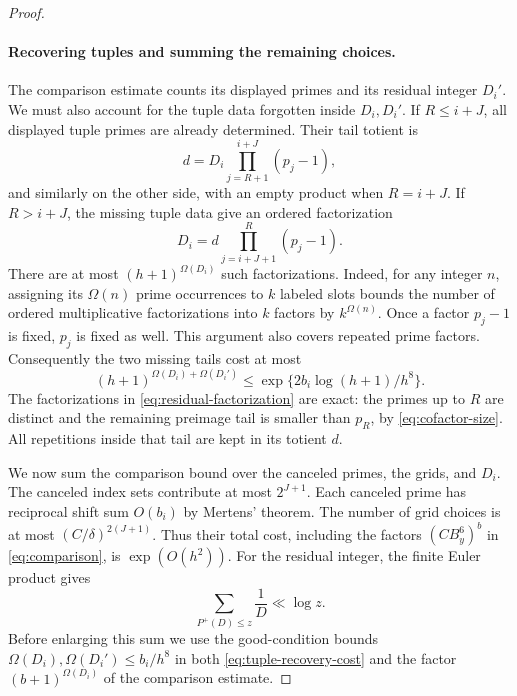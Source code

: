 \begin{proof}
\paragraph{Recovering tuples and summing the remaining choices.}
The comparison estimate counts its displayed primes and its residual
integer $D_i'$.  We must also account for the tuple data forgotten
inside $D_i,D_i'$.  If $R\le i+J$, all displayed tuple primes are
already determined.  Their tail totient is
\[
 d=D_i\prod_{j=R+1}^{i+J}(p_j-1),
\]
and similarly on the other side, with an empty product when $R=i+J$.
If $R>i+J$, the missing tuple data give an ordered factorization
\begin{equation}\label{eq:residual-factorization}
 D_i=d\prod_{j=i+J+1}^{R}(p_j-1).
\end{equation}
There are at most $(h+1)^{\Omega(D_i)}$ such factorizations.  Indeed,
for any integer $n$, assigning its $\Omega(n)$ prime occurrences to
$k$ labeled slots bounds the number of ordered multiplicative
factorizations into $k$ factors by $k^{\Omega(n)}$.  Once a factor
$p_j-1$ is fixed, $p_j$ is fixed as well.  This argument also covers
repeated prime factors.  Consequently the two missing tails cost at most
\begin{equation}\label{eq:tuple-recovery-cost}
 (h+1)^{\Omega(D_i)+\Omega(D_i')}
       \le\exp\{2b_i\log(h+1)/h^8\}.
\end{equation}
The factorizations in \eqref{eq:residual-factorization} are exact:
the primes up to $R$ are distinct and the remaining preimage tail is
smaller than $p_R$, by \eqref{eq:cofactor-size}.  All repetitions inside
that tail are kept in its totient $d$.

We now sum the comparison bound over the canceled primes, the grids,
and $D_i$.  The canceled index sets contribute at most $2^{J+1}$.
Each canceled prime has reciprocal shift sum $O(b_i)$ by Mertens'
theorem.  The number of grid choices is at most
$(C/\delta)^{2(J+1)}$.  Thus their total cost, including the factors
$(CB_y^6)^b$ in \eqref{eq:comparison}, is $\exp(O(h^2))$.
For the residual integer, the finite Euler product gives
\[
 \sum_{P^+(D)\le z}\frac1D\ll\log z.
\]
Before enlarging this sum we use the good-condition bounds
$\Omega(D_i),\Omega(D_i')\le b_i/h^8$ in both
\eqref{eq:tuple-recovery-cost} and the factor $(b+1)^{\Omega(D_i)}$
of the comparison estimate.


\end{proof}
